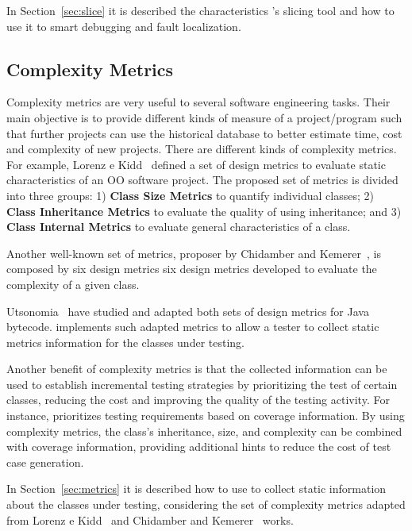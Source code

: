 In Section~\ref{sec:slice} it is described the characteristics
\toolname's slicing tool and how to use it to smart debugging and
fault localization.

\subsection{Complexity Metrics}\label{sec:bk-metrics}

Complexity metrics are very useful to several software engineering
tasks. Their main objective is to provide different kinds of
measure of a project/program such that further projects can use
the historical database to better estimate time, cost and
complexity of new projects. There are different kinds of
complexity metrics. For example, Lorenz e Kidd~\cite{Lorenz94OOSM}
defined a set of design metrics to evaluate static characteristics
of an OO software project. The proposed set of metrics is divided
into three groups: 1) \textbf{Class Size Metrics} to quantify
individual classes; 2) \textbf{Class Inheritance Metrics} to
evaluate the quality of using inheritance; and 3) \textbf{Class
Internal Metrics} to evaluate general characteristics of a class.

Another well-known set of metrics, proposer by Chidamber and
Kemerer~\cite{Chidamber94MSOO}, is composed by six design metrics
six design metrics developed to evaluate the complexity of a given
class.

Utsonomia~\cite{Utsonomia02EAMS} have studied and adapted both
sets of design metrics for Java bytecode. \toolname implements
such adapted metrics to allow a tester to collect static metrics
information for the classes under testing.

Another benefit of complexity metrics is that the collected
information can be used to establish incremental testing
strategies by prioritizing the test of certain classes, reducing
the cost and improving the quality of the testing activity. For
instance, \toolname prioritizes testing requirements based on
coverage information. By using complexity metrics, the class's
inheritance, size, and complexity can be combined with coverage
information, providing additional hints to reduce the cost of test
case generation.

In Section~\ref{sec:metrics} it is described how to use \toolname
to collect static information about the classes under testing,
considering the set of complexity metrics adapted from Lorenz e
Kidd~\cite{Lorenz94OOSM} and Chidamber and
Kemerer~\cite{Chidamber94MSOO} works.
